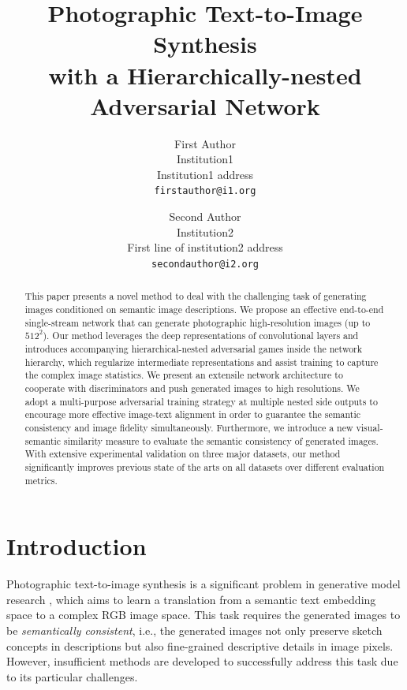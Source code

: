 \documentclass[10pt,twocolumn,letterpaper]{article}
\begin{document}
\title{Photographic Text-to-Image Synthesis \\ with a Hierarchically-nested Adversarial Network}

\author{First Author\\
Institution1\\
Institution1 address\\
{\tt\small firstauthor@i1.org}
\and
Second Author\\
Institution2\\
First line of institution2 address\\
{\tt\small secondauthor@i2.org}
}

\maketitle

\begin{abstract}
This paper presents a novel method to deal with the challenging task of generating images conditioned on semantic image descriptions. We propose an effective end-to-end single-stream network that can generate photographic high-resolution images (up to $512^2$). Our method leverages the deep representations of convolutional layers and introduces accompanying hierarchical-nested adversarial games inside the network hierarchy, which regularize intermediate representations and assist training to capture the complex image statistics. We present an extensile network architecture to cooperate with discriminators and push generated images to high resolutions. 
We adopt a multi-purpose adversarial training strategy at multiple nested side outputs to encourage more effective image-text alignment in order to guarantee the semantic consistency and image fidelity simultaneously. Furthermore, we introduce a new visual-semantic similarity measure to evaluate the semantic consistency of generated images.
With extensive experimental validation on three major datasets, our method significantly improves previous state of the arts on all datasets over different evaluation metrics. 
\end{abstract}


\section{Introduction}
Photographic text-to-image synthesis is a significant problem in generative model research \cite{reed2016generative}, which aims to learn a translation from a semantic text embedding space to a complex RGB image space. This task requires the generated images to be \textit{semantically consistent}, i.e., the generated images not only preserve sketch concepts in descriptions but also fine-grained descriptive details in image pixels. 
However, insufficient methods are developed to successfully address this task due to its particular challenges. 
\end{document}
